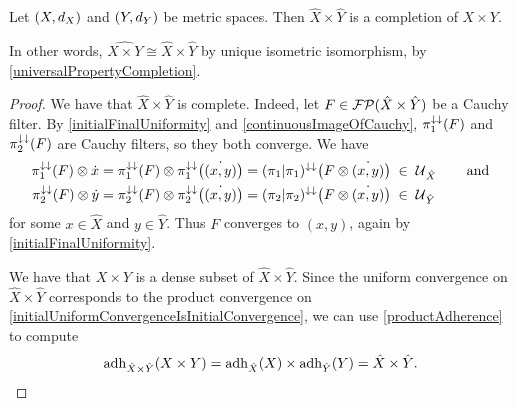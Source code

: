\begin{proposition}
Let $\sSet{X,d_X}$ and $\sSet{Y,d_Y}$ be metric spaces. Then $\hat{X} \times \hat{Y}$ is a completion of $X\times Y$.
\end{proposition}
In other words, $\widehat{X\times Y} \cong \hat{X} \times \hat{Y}$ by unique isometric isomorphism, by \ref{universalPropertyCompletion}.
\begin{proof}
We have that $\hat{X} \times \hat{Y}$ is complete. Indeed, let $F\in \operatorname{\mathcal{FP}}(\hat{X}\times \hat{Y})$ be a Cauchy filter. By \ref{initialFinalUniformity} and \ref{continuousImageOfCauchy}, $\pi_1^{\downarrow\downarrow}(F)$ and $\pi_2^{\downarrow\downarrow}(F)$ are Cauchy filters, so they both converge. We have
\begin{align*}
\pi_1^{\downarrow\downarrow}(F)\otimes \dot{x} &= \pi_1^{\downarrow\downarrow}(F)\otimes \pi_1^{\downarrow\downarrow}\big(\dot{(x,y)}\big) = (\pi_1|\pi_1)^{\downarrow\downarrow}\big(F\otimes \dot{(x,y)}\big) \;\in\;\operatorname{\mathcal{U}}_{\hat{X}}\qquad \text{and} \\
\pi_2^{\downarrow\downarrow}(F)\otimes\dot{y} &= \pi_2^{\downarrow\downarrow}(F)\otimes\pi_2^{\downarrow\downarrow}\big(\dot{(x,y)}\big) = (\pi_2|\pi_2)^{\downarrow\downarrow}\big(F\otimes \dot{(x,y)}\big) \;\in\;\operatorname{\mathcal{U}}_{\hat{Y}}
\end{align*}
for some $x\in\hat{X}$ and $y\in \hat{Y}$. Thus $F$ converges to $(x, y)$, again by \ref{initialFinalUniformity}.

We have that $X\times Y$ is a dense subset of $\hat{X} \times \hat{Y}$. Since the uniform convergence on $\hat{X} \times \hat{Y}$ corresponds to the product convergence on \ref{initialUniformConvergenceIsInitialConvergence}, we can use \ref{productAdherence} to compute
\[ \operatorname{adh}_{\hat{X} \times \hat{Y}}(X\times Y) = \operatorname{adh}_{\hat{X}}(X) \times \operatorname{adh}_{\hat{Y}}(Y) = \hat{X}\times \hat{Y}. \]
\end{proof}

